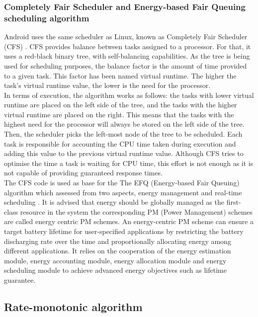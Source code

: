 \documentclass[conference]{IEEEtran}
\begin{document}
\subsubsection{Completely Fair Scheduler and Energy-based Fair Queuing scheduling algorithm}

Android uses the same scheduler as Linux, known as Completely Fair Scheduler (CFS) \cite{ANDR01}. CFS provides balance between tasks assigned to a processor. For that, it uses a red-black binary tree,  with self-balancing capabilities.  As the tree is being used for scheduling purposes, the balance factor is the amount of time provided to a given task. This
factor has been named virtual runtime. The higher the task’s virtual runtime value, the lower is the need for the processor.\\
In terms of execution, the algorithm works as follows: the tasks with lower virtual runtime are placed on the left side of the tree, and the tasks with the higher virtual runtime are placed on the right. This means that the tasks with the highest need for the processor will always be  stored on the left side of the tree. Then, the scheduler picks the left-most
node of the tree to be scheduled. Each task is responsible for accounting the CPU time taken during execution and adding this value to the previous virtual runtime value. Although CFS tries to optimise the time a task is waiting for CPU time, this effort is not enough as it is not capable of providing guaranteed response times. \\

The CFS code is used as base for the The EFQ (Energy-based Fair Queuing) algorithm which assessed from two aspects, energy management and real-time scheduling \cite{WEI01}. 
It is advised that energy should be globally managed as the first-class resource in the system  the corresponding PM (Power Management) schemes are called energy centric PM schemes. An energy-centric PM scheme can ensure a target battery lifetime for user-specified applications by restricting the battery discharging rate over the time and proportionally allocating energy among different applications.  It relies on the cooperation of the energy estimation module, energy accounting module, energy allocation module and energy scheduling module to achieve advanced energy objectives such as lifetime guarantee.\\

\subsection{Rate-monotonic algorithm}
\end{document}
